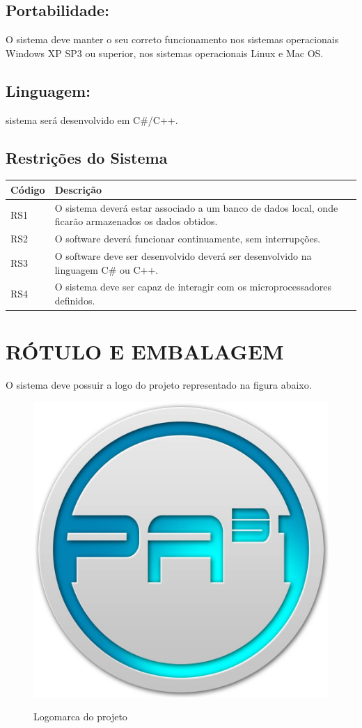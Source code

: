  \subsection{Portabilidade:}
  O sistema deve manter o seu correto funcionamento nos sistemas operacionais Windows XP SP3 ou superior, nos sistemas operacionais Linux e Mac OS.
	
  \subsection{Linguagem:}
   sistema será desenvolvido em C\#/C++.

  \subsection{Restrições do Sistema}
  
     \begin{longtable}{|m{4.0cm}|m{12.2cm}|}
  \hline
\textbf{Código} & \textbf{Descrição}\\
  \hline
RS1 & O sistema deverá estar associado a um banco de dados local, onde ficarão armazenados os dados obtidos.\\
  \hline
RS2 & O software deverá funcionar continuamente, sem interrupções.\\
  \hline
RS3 & O software deve ser desenvolvido deverá ser desenvolvido na linguagem C\# ou C++.\\
  \hline
RS4 & O sistema deve ser capaz de interagir com os microprocessadores definidos.\\
  \hline
 \end{longtable}
  
  \section{RÓTULO E EMBALAGEM}
  
  O sistema deve possuir a logo do projeto representado na figura abaixo.
  
    \begin{figure}[!h]
    \centering
    \includegraphics[scale = 0.2]{editaveis/figuras/logo}
    \label{logo}
    \caption{Logomarca do projeto}
   \end{figure}
   \FloatBarrier
 
